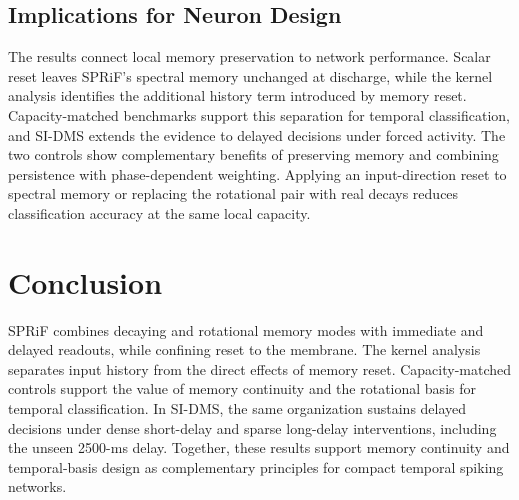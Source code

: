 \documentclass[letterpaper,journal]{IEEEtran}
\begin{document}
\subsection{Implications for Neuron Design}
\label{sec:discussion}

The results connect local memory preservation to network performance. Scalar reset leaves SPRiF's spectral memory unchanged at discharge, while the kernel analysis identifies the additional history term introduced by memory reset. Capacity-matched benchmarks support this separation for temporal classification, and SI-DMS extends the evidence to delayed decisions under forced activity. The two controls show complementary benefits of preserving memory and combining persistence with phase-dependent weighting. Applying an input-direction reset to spectral memory or replacing the rotational pair with real decays reduces classification accuracy at the same local capacity.

\section{Conclusion}
\label{sec:conclusion}

SPRiF combines decaying and rotational memory modes with immediate and delayed readouts, while confining reset to the membrane. The kernel analysis separates input history from the direct effects of memory reset. Capacity-matched controls support the value of memory continuity and the rotational basis for temporal classification. In SI-DMS, the same organization sustains delayed decisions under dense short-delay and sparse long-delay interventions, including the unseen 2500-ms delay. Together, these results support memory continuity and temporal-basis design as complementary principles for compact temporal spiking networks.



\end{document}

